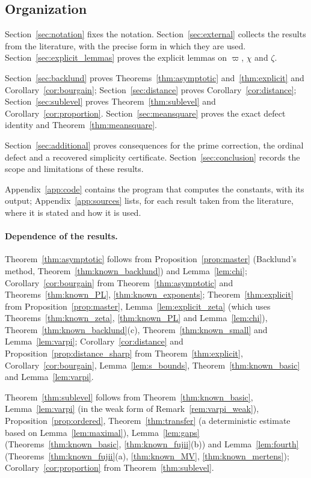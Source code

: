 \documentclass[11pt,a4paper]{article}
\makeatletter
\numberwithin{equation}{section}
\DeclareRobustCommand{\CGref}[1]{\ref{#1}}
\let\CG@origref\ref
\newcommand{\CG@gettip}[1]{\@ifundefined{CGTip@#1}{#1}{\csname CGTip@#1\endcsname}}
\DeclareRobustCommand{\CGref}[1]{\pdftooltip{\CG@origref{#1}}{\CG@gettip{#1}}}
\theoremstyle{definition}
\theoremstyle{remark}
\makeatother
\begin{document}
\subsection{Organization}
Section~\CGref{sec:notation} fixes the notation. Section~\CGref{sec:external} collects the results from the literature, with the precise form in which they are used. Section~\CGref{sec:explicit_lemmas} proves the explicit lemmas on $\varpi$, $\chi$ and $\zeta$.

Section~\CGref{sec:backlund} proves Theorems~\CGref{thm:asymptotic} and~\CGref{thm:explicit} and Corollary~\CGref{cor:bourgain}; Section~\CGref{sec:distance} proves Corollary~\CGref{cor:distance}; Section~\CGref{sec:sublevel} proves Theorem~\CGref{thm:sublevel} and Corollary~\CGref{cor:proportion}. Section~\CGref{sec:meansquare} proves the exact defect identity and Theorem~\CGref{thm:meansquare}.

Section~\CGref{sec:additional} proves consequences for the prime correction, the ordinal defect and a recovered simplicity certificate. Section~\CGref{sec:conclusion} records the scope and limitations of these results.

Appendix~\CGref{app:code} contains the program that computes the constants, with its output; Appendix~\CGref{app:sources} lists, for each result taken from the literature, where it is stated and how it is used.

\paragraph{Dependence of the results.}
Theorem~\CGref{thm:asymptotic} follows from Proposition~\CGref{prop:master} (Backlund's method, Theorem~\CGref{thm:known_backlund}) and Lemma~\CGref{lem:chi}; Corollary~\CGref{cor:bourgain} from Theorem~\CGref{thm:asymptotic} and Theorems~\CGref{thm:known_PL}, \CGref{thm:known_exponents}; Theorem~\CGref{thm:explicit} from Proposition~\CGref{prop:master}, Lemma~\CGref{lem:explicit_zeta} (which uses Theorems~\CGref{thm:known_zeta}, \CGref{thm:known_PL} and Lemma~\CGref{lem:chi}), Theorem~\CGref{thm:known_backlund}(c), Theorem~\CGref{thm:known_small} and Lemma~\CGref{lem:varpi}; Corollary~\CGref{cor:distance} and Proposition~\CGref{prop:distance_sharp} from Theorem~\CGref{thm:explicit}, Corollary~\CGref{cor:bourgain}, Lemma~\CGref{lem:s_bounds}, Theorem~\CGref{thm:known_basic} and Lemma~\CGref{lem:varpi}.

Theorem~\CGref{thm:sublevel} follows from Theorem~\CGref{thm:known_basic}, Lemma~\CGref{lem:varpi} (in the weak form of Remark~\CGref{rem:varpi_weak}), Proposition~\CGref{prop:ordered}, Theorem~\CGref{thm:transfer} (a deterministic estimate based on Lemma~\CGref{lem:maximal}), Lemma~\CGref{lem:gaps} (Theorems~\CGref{thm:known_basic}, \CGref{thm:known_fujii}(b)) and Lemma~\CGref{lem:fourth} (Theorems~\CGref{thm:known_fujii}(a), \CGref{thm:known_MV}, \CGref{thm:known_mertens}); Corollary~\CGref{cor:proportion} from Theorem~\CGref{thm:sublevel}.
\end{document}
